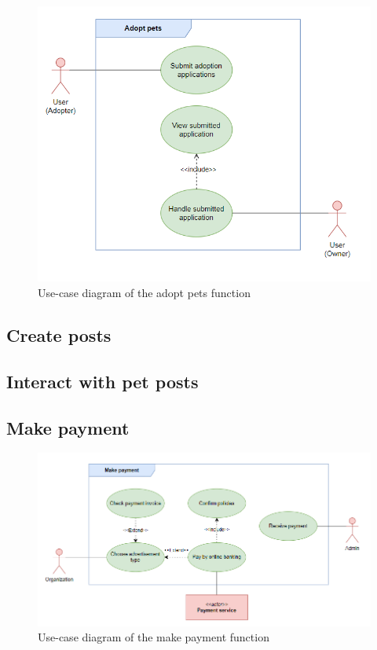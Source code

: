 \begin {figure}[H]
\centering
\includegraphics[width=1\textwidth]{Figures/adopt_pet_ucd.png}
\caption{Use-case diagram of the adopt pets function}
\label{fig:adopt-pet-activity-diagram}
\end{figure}



\subsection{Create posts}



\subsection{Interact with pet posts}


\subsection{Make payment}

\begin {figure}[H]
\centering
\includegraphics[width=1\textwidth]{Figures/payment_ucd.png}
\caption{Use-case diagram of the make payment function}
\label{fig:payment-activity-diagram}
\end{figure}


